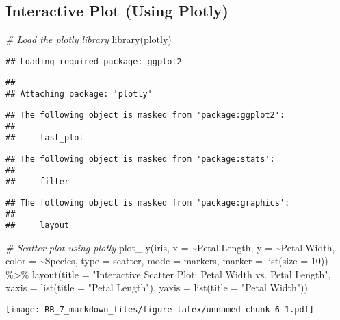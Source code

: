 \documentclass[
]{article}
\newenvironment{Shaded}{\begin{snugshade}}{\end{snugshade}}
\newcommand{\AttributeTok}[1]{\textcolor[rgb]{0.77,0.63,0.00}{#1}}
\newcommand{\CommentTok}[1]{\textcolor[rgb]{0.56,0.35,0.01}{\textit{#1}}}
\newcommand{\DecValTok}[1]{\textcolor[rgb]{0.00,0.00,0.81}{#1}}
\newcommand{\FunctionTok}[1]{\textcolor[rgb]{0.00,0.00,0.00}{#1}}
\newcommand{\NormalTok}[1]{#1}
\newcommand{\SpecialCharTok}[1]{\textcolor[rgb]{0.00,0.00,0.00}{#1}}
\newcommand{\StringTok}[1]{\textcolor[rgb]{0.31,0.60,0.02}{#1}}
\begin{document}
\hypertarget{interactive-plot-using-plotly}{%
\subsection{Interactive Plot (Using
Plotly)}\label{interactive-plot-using-plotly}}

\begin{Shaded}
\begin{Highlighting}[]
\CommentTok{\# Load the plotly library}
\FunctionTok{library}\NormalTok{(plotly)}
\end{Highlighting}
\end{Shaded}

\begin{verbatim}
## Loading required package: ggplot2
\end{verbatim}

\begin{verbatim}
## 
## Attaching package: 'plotly'
\end{verbatim}

\begin{verbatim}
## The following object is masked from 'package:ggplot2':
## 
##     last_plot
\end{verbatim}

\begin{verbatim}
## The following object is masked from 'package:stats':
## 
##     filter
\end{verbatim}

\begin{verbatim}
## The following object is masked from 'package:graphics':
## 
##     layout
\end{verbatim}

\begin{Shaded}
\begin{Highlighting}[]
\CommentTok{\# Scatter plot using plotly}
\FunctionTok{plot\_ly}\NormalTok{(iris, }\AttributeTok{x =} \SpecialCharTok{\textasciitilde{}}\NormalTok{Petal.Length, }\AttributeTok{y =} \SpecialCharTok{\textasciitilde{}}\NormalTok{Petal.Width, }\AttributeTok{color =} \SpecialCharTok{\textasciitilde{}}\NormalTok{Species,}
        \AttributeTok{type =} \StringTok{\textquotesingle{}scatter\textquotesingle{}}\NormalTok{, }\AttributeTok{mode =} \StringTok{\textquotesingle{}markers\textquotesingle{}}\NormalTok{, }
        \AttributeTok{marker =} \FunctionTok{list}\NormalTok{(}\AttributeTok{size =} \DecValTok{10}\NormalTok{)) }\SpecialCharTok{\%\textgreater{}\%}
  \FunctionTok{layout}\NormalTok{(}\AttributeTok{title =} \StringTok{"Interactive Scatter Plot: Petal Width vs. Petal Length"}\NormalTok{,}
         \AttributeTok{xaxis =} \FunctionTok{list}\NormalTok{(}\AttributeTok{title =} \StringTok{"Petal Length"}\NormalTok{),}
         \AttributeTok{yaxis =} \FunctionTok{list}\NormalTok{(}\AttributeTok{title =} \StringTok{"Petal Width"}\NormalTok{))}
\end{Highlighting}
\end{Shaded}

\texttt{[image: RR\_7\_markdown\_files/figure-latex/unnamed-chunk-6-1.pdf]}
\end{document}
